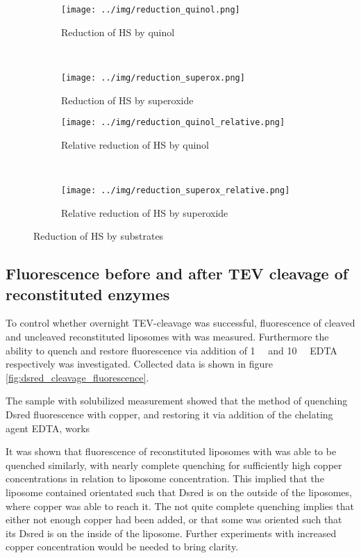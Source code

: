 \begin{figure*}
    \centering
    \begin{subfigure}{0.45\textwidth}
	\centering
	\texttt{[image: ../img/reduction\_quinol.png]}
	\caption{Reduction of HS by quinol}
	\label{fig:reduction_quinol}
    \end{subfigure}
    ~
    \begin{subfigure}{0.45\textwidth}
	\centering
	\texttt{[image: ../img/reduction\_superox.png]}
	\caption{Reduction of HS by superoxide}
	\label{fig:reduction_superox}
    \end{subfigure}

    \begin{subfigure}{0.45\textwidth}
	\centering
	\texttt{[image: ../img/reduction\_quinol\_relative.png]}
	\caption{Relative reduction of HS by quinol}
	\label{fig:reduction_quinol_relative}
    \end{subfigure}
    ~
    \begin{subfigure}{0.45\textwidth}
	\centering
	\texttt{[image: ../img/reduction\_superox\_relative.png]}
	\caption{Relative reduction of HS by superoxide}
	\label{fig:reduction_superox_relative}
    \end{subfigure}
    \caption{Reduction of HS by substrates}
    \label{fig:hs_reduction}
\end{figure*}


\subsection{Fluorescence before and after TEV cleavage of reconstituted enzymes}

To control whether overnight TEV-cleavage was successful, fluorescence of
cleaved and uncleaved reconstituted liposomes with \hsmut{} was measured.
Furthermore the ability to quench and restore fluorescence via addition of
\SI{1}{\milli\Molar}  and \SI{10}{\milli\Molar} EDTA respectively
was investigated. Collected data is shown in figure
\ref{fig:dsred_cleavage_fluorescence}.

The sample with solubilized measurement showed that the method of quenching
Dsred fluorescence with copper, and restoring it via addition of the chelating
agent EDTA, works

It was shown that fluorescence of reconstituted liposomes with \hsdsred{} was
able to be quenched similarly, with nearly complete quenching for sufficiently
high copper concentrations in relation to liposome concentration. This implied
that the liposome contained \hsdsred{} orientated such that Dsred is on the
outside of the liposomes, where copper was able to reach it. The not quite
complete quenching implies that either not enough copper had been added, or
that some \hsdsred{} was oriented such that its Dsred is on the inside of the
liposome. Further experiments with increased copper concentration would be
needed to bring clarity.

